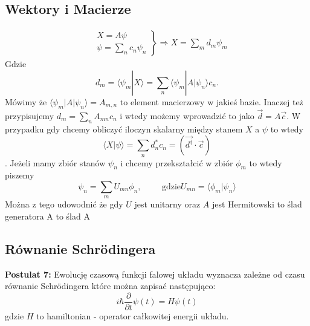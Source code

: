 \subsection{Wektory i Macierze}
\begin{align*}
	&\left.
	\begin{aligned}
		X = A \psi \\
		\psi = \sum_n c_n \psi_n
	\end{aligned}
	\right\}
	\Rightarrow X = \sum_m d_m \psi_m
\end{align*}
Gdzie $$d_m = \langle \psi_m | X \rangle = \sum_n \langle \psi_m | A | \psi_n \rangle c_n.$$ Mówimy że $\langle \psi_m | A | \psi_n \rangle = A_{m,n}$ to element macierzowy w jakieś bazie. Inaczej też przypisujemy $ d_m = \sum_n A_{mn}c_n $ i wtedy możemy wprowadzić to jako $\vec{d} = A \vec{c}$. W przypadku gdy chcemy obliczyć iloczyn skalarny między stanem $X$ a $\psi$ to wtedy $$ \langle X | \psi \rangle = \sum_n d_n^* c_n = (\vec{d^{\dagger}} \cdot \vec{c})$$. 
Jeżeli mamy zbiór stanów ${\psi}_n$ i chcemy przekształcić w zbiór ${\phi_m}$ to wtedy piszemy
\begin{equation*}
	\psi_n = \sum_m U_{mn}\phi_n, \hspace{1cm} \text{gdzie} U_{mn} = \langle \phi_m | \psi_n \rangle
\end{equation*}
Można z tego udowodnić że gdy $U$ jest unitarny oraz $A$ jest Hermitowski to ślad generatora A to ślad A
\subsection{Równanie Schrödingera}
\textbf{Postulat 7:} Ewolucję czasową funkcji falowej układu wyznacza zależne od czasu równanie Schrödingera które można zapisać następująco:
\begin{equation*}
	i \hbar \frac{\partial}{\partial t} \psi(t)=H \psi(t)
\end{equation*}
gdzie $H$ to hamiltonian - operator całkowitej energii układu.

